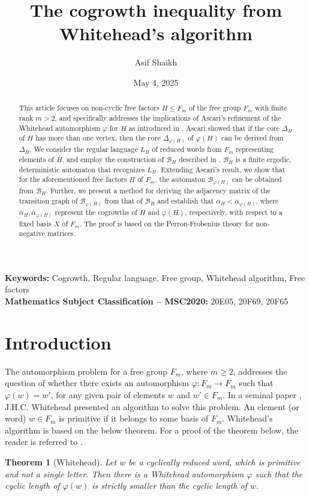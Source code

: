 \documentclass{article}
\title{The cogrowth inequality from Whitehead's algorithm}
\author{Asif Shaikh}
\affil[]{asif.shaikh@fulbrightmail.org}
\date{May 4, 2025}
\newtheorem{introthm}{Theorem}
\newcommand{\B}{\mathcal{B}}
\begin{document}
\maketitle
\begin{abstract}
This article focuses on non-cyclic free factors $H\leq F_m$ of the free group $F_m$ with finite rank $m > 2$, and specifically addresses the implications of Ascari's refinement of the Whitehead automorphism $\varphi$ for $H$ as introduced in \cite{ascari2021fine}. Ascari showed that if the core $\Delta_H$ of $H$ has more than one vertex, then the core $\Delta_{\varphi(H)}$ of $\varphi(H)$ can be derived from $\Delta_H$. We consider the regular language $L_H$ of reduced words from $F_m$ representing elements of $H$, and employ the construction of $\B_H$ described  in \cite{DGS2021}. $\B_H$ is a finite ergodic, deterministic automaton that recognizes $L_H$. Extending Ascari's result, we show that for the aforementioned free factors $H$ of $F_m$, the automaton $\B_{\varphi(H)}$ can be obtained from $\B_H$. Further, we present a method for deriving the adjacency matrix of the transition graph of $\B_{\varphi(H)}$ from that of $\B_H$ and establish that $\alpha_H < \alpha_{\varphi(H)}$, where $\alpha_H, \alpha_{\varphi(H)}$ represent the cogrowths of $H$ and $\varphi(H)$, respectively, with respect to a fixed basis $X$ of $F_m$. The proof is based on the Perron-Frobenius theory for non-negative matrices.
\end{abstract}
{\bf Keywords:}  Cogrowth,  Regular language, Free group, Whitehead algorithm, Free factors\\
{\bf Mathematics Subject Classification – MSC2020:} 20E05, 20F69, 20F65
\section{Introduction}\label{sec:intro}

The automorphism problem for a free group $F_m$, where $m \geq 2$, addresses the question of whether there exists an automorphism $\varphi : F_m \rightarrow F_m$ such that $\varphi(w) = w'$, for any given pair of elements $w$ and $w' \in F_m$. In a seminal paper \cite{WhiteheadMR1503309}, J.H.C. Whitehead presented an algorithm to solve this problem. An element (or word) $w \in F_m$ is primitive if it belongs to some basis of $F_m$. Whitehead's algorithm is based on the below theorem. For a proof of the theorem below, the reader is referred to \cite{WhiteheadMR1503309}.

\begin{introthm}[Whitehead]\label{introWhitehead}
Let $w$ be a cyclically reduced word, which is primitive and not a single letter. Then there is a Whitehead automorphism $\varphi$ such that the cyclic length  of $\varphi(w)$ is strictly smaller than the cyclic length of $w$.
\end{introthm}
\end{document}
